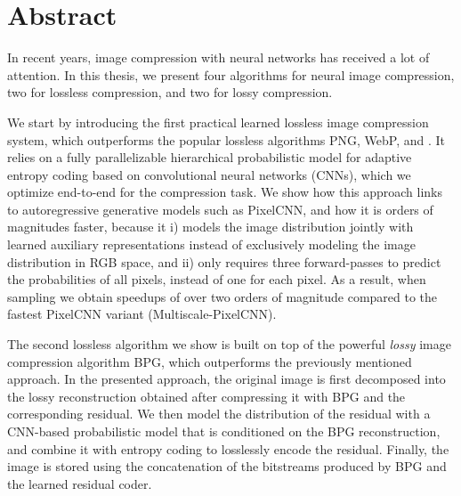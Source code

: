 \begingroup
\let\clearpage\relax
\let\cleardoublepage\relax
\let\cleardoublepage\relax

\chapter*{Abstract}

In recent years, image compression with neural networks has received a lot of 
attention. In this thesis, we present four algorithms for neural image compression,
two for lossless compression, and two for lossy compression.

We start by introducing the first practical learned lossless image compression
system, which outperforms the popular lossless algorithms PNG, WebP, and
\jpegk. It relies on a fully parallelizable hierarchical probabilistic model
for adaptive entropy coding based on convolutional neural networks (CNNs), which we
optimize end-to-end for the compression task. We show how this approach
links to autoregressive generative models such as PixelCNN, and how it is
orders of magnitudes faster, because it i) models the image distribution
jointly with learned auxiliary representations instead of exclusively
modeling the image distribution in RGB space, and ii) only requires three
forward-passes to predict the probabilities of all pixels, instead of one
for each pixel.  As a result, when sampling we obtain speedups of over two orders of
magnitude compared to the fastest PixelCNN variant
(Multiscale-PixelCNN). 

The second lossless algorithm we show is built on top of the powerful \emph{lossy}
image compression algorithm BPG, which outperforms the previously mentioned
approach. %
In the presented approach, the original image is first decomposed into the
lossy reconstruction obtained after compressing it with BPG and the
corresponding residual.  We then model the distribution of the residual with a
CNN-based probabilistic model that is conditioned on
the BPG reconstruction, and combine it with entropy coding to losslessly encode
the residual. Finally, the image is stored using the concatenation of the
bitstreams produced by BPG and the learned residual coder. 

